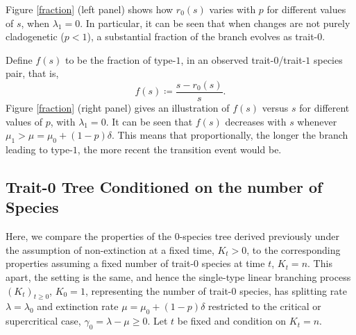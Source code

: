 \documentclass[a4paper,11pt]{article}
\theoremstyle{plain}
\theoremstyle{definition}
\numberwithin{equation}{section}
\begin{document}
Figure \ref{fraction} (left panel) shows how $r_0(s)$ varies with $p$ 
for different values of $s$, when $\lambda_1=0$. In particular, 
it can be seen that when changes are not purely cladogenetic ($p<1$), 
a substantial fraction of the branch evolves as trait-$0$.

Define $f(s)$ to be the fraction of type-$1$, in an 
observed trait-$0$/trait-$1$ species pair, that is,  
\[
f(s)\coloneqq\frac{s-r_0(s)}{s}.
\]
Figure \ref{fraction} (right panel) gives an illustration of $f(s)$ versus 
$s$ for different values of $p$, with $\lambda_1=0$. It can be seen that $f(s)$ 
decreases with $s$ whenever $\mu_1>\mu=\mu_0+(1-p)\delta$. 
This means that proportionally, the longer the branch leading to type-$1$, 
the more recent the transition event would be.




\subsection*{Trait-0 Tree Conditioned on the number of Species}

Here, we compare the properties of the $0$-species tree derived
previously under the assumption of non-extinction at a fixed time,
$K_t>0$, to the corresponding properties assuming a fixed number of
trait-$0$ species at time $t$, $K_t=n$. This apart, the setting is the
same, and hence the single-type linear branching process $(K_t)_{t\ge 0}$,
$K_0=1$, representing the number of trait-$0$ species, has splitting rate
$\lambda=\lambda_0$ and extinction rate $\mu=\mu_0+(1-p)\delta$
restricted to the critical or supercritical case,
$\gamma_0=\lambda-\mu\ge 0$.  Let $t$ be fixed and condition on $K_t=n$.
\end{document}
